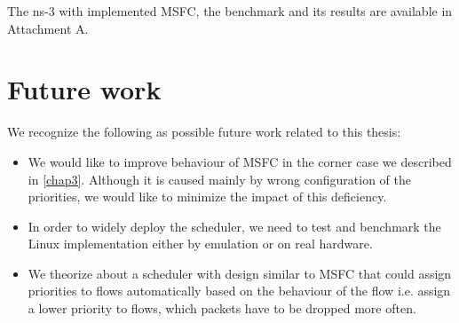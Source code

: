 The ns-3 with implemented MSFC, the benchmark and its results are available in Attachment A.

\section*{Future work}

We recognize the following as possible future work related to this thesis:
\begin{itemize}
	\item We would like to improve behaviour of MSFC in the corner case we described in \autoref{chap3}. Although it is caused mainly by wrong configuration of the priorities, we would like to minimize the impact of this deficiency.
	\item In order to widely deploy the scheduler, we need to test and benchmark the Linux implementation either by emulation or on real hardware.
	\item We theorize about a scheduler with design similar to MSFC that could assign priorities to flows automatically based on the behaviour of the flow i.e. assign a lower priority to flows, which packets have to be dropped more often.
\end{itemize}